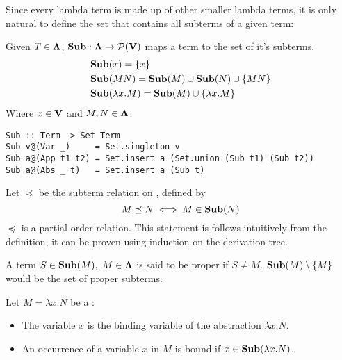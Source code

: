 \documentclass[12pt]{book}
\begin{document}
Since every lambda term is made up of other smaller lambda terms, it is only natural to define the set that contains all subterms of a given term:
\begin{definition} Given $T \in \mathbf{\Lambda}$, $\mathbf{Sub} : \mathbf{\Lambda} \to \mathcal{P}(\mathbf{V})$ maps a term to the set of it's subterms.
  \begin{align*}
    &\mathbf{Sub}(x) = \{x\} \\
    &\mathbf{Sub}(MN) = \mathbf{Sub}(M)  \cup \mathbf{Sub}(N) \cup \{MN\} \\
    &\mathbf{Sub}(\lambda x . M) = \mathbf{Sub}(M)  \cup \{\lambda x. M\}
  \end{align*}
  Where $x \in \mathbf{V}$ and $M, N \in \mathbf{\Lambda} $.
  \begin{lstlisting}[style=haskellstyle,caption={Haskell implementation of Subb.}]
Sub :: Term -> Set Term
Sub v@(Var _)     = Set.singleton v
Sub a@(App t1 t2) = Set.insert a (Set.union (Sub t1) (Sub t2))
Sub a@(Abs _ t)   = Set.insert a (Sub t)
  \end{lstlisting}
\end{definition}
\begin{remark}
  Let \( \preceq \) be the subterm relation on \lterms, defined by
  \[
    M \preceq N \iff M \in \mathbf{Sub}( N )
  \]
  \( \preceq \) is a partial order relation. This statement is follows intuitively from the definition, it can be proven using induction on the derivation tree.
\end{remark}
\begin{definition} A term $ S \in \mathbf{Sub}(M), \ M \in \mathbf{\Lambda}$ is said to be proper if $S \neq M$. $\mathbf{Sub}(M) \setminus \{M\}$ would be the set of proper subterms.
\end{definition}
\begin{definition} Let \( M = \lambda x. N \) be a \lterm:
  \begin{itemize}
  \item The variable \( x \) is the binding variable of the abstraction \( \lambda x. N \).
  \item An occurrence of a variable \( x \) in \( M \) is bound if \( x \in \mathbf{Sub}( \lambda x. N ) \).
  \end{itemize}
\end{definition}
\end{document}
